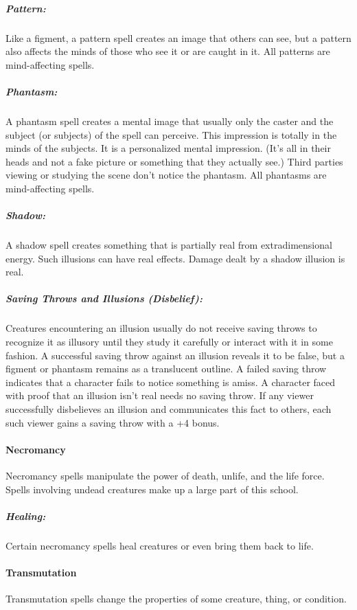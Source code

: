 \subparagraph{Pattern:}
Like a figment, a pattern spell creates an image that others can see, but a pattern also affects the minds of those who see it or are caught in it. 
All patterns are mind-affecting spells.

\subparagraph{Phantasm:}
A phantasm spell creates a mental image that usually only the caster and the subject (or subjects) of the spell can perceive. 
This impression is totally in the minds of the subjects. It is a personalized mental impression. (It's all in their heads and not a fake picture or something that they actually see.) 
Third parties viewing or studying the scene don't notice the phantasm. All phantasms are mind-affecting spells.

\subparagraph{Shadow:}
A shadow spell creates something that is partially real from extradimensional energy. 
Such illusions can have real effects. Damage dealt by a shadow illusion is real.

\subparagraph{Saving Throws and Illusions (Disbelief):}
Creatures encountering an illusion usually do not receive saving throws to recognize 
it as illusory until they study it carefully or interact with it in some fashion.
A successful saving throw against an illusion reveals it to be false, 
but a figment or phantasm remains as a translucent outline.
A failed saving throw indicates that a character fails to notice something is amiss. 
A character faced with proof that an illusion isn't real needs no saving throw. 
If any viewer successfully disbelieves an illusion and communicates this fact to others, 
each such viewer gains a saving throw with a +4 bonus.

\paragraph{Necromancy}
Necromancy spells manipulate the power of death, unlife, and the life force. 
Spells involving undead creatures make up a large part of this school.

\subparagraph{Healing:}
Certain necromancy spells heal creatures or even bring them back to life.
\paragraph{Transmutation}
Transmutation spells change the properties of some creature, thing, or condition.


